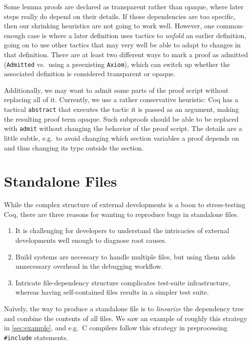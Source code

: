 \documentclass[a4paper,USenglish,cleveref,autoref,thm-restate]{lipics-v2021}
\begin{document}
Some lemma proofs are declared as transparent rather than opaque, where later steps really do depend on their details.
If those dependencies are too specific, then our shrinking heuristics are not going to work well.
However, one common-enough case is where a later definition uses tactics to \emph{unfold} an earlier definition, going on to use other tactics that may very well be able to adapt to changes in that definition.
There are at least two different ways to mark a proof as admitted (\texttt{Admitted} vs.\ using a preexisting \texttt{Axiom}), which can switch up whether the associated definition is considered transparent or opaque.

Additionally, we may want to admit some parts of the proof script without replacing all of it.
Currently, we use a rather conservative heuristic:
Coq has a tactical \verb|abstract| that executes the tactic it is passed as an argument, making the resulting proof term opaque.
Such subproofs should be able to be replaced with \verb|admit| without changing the behavior of the proof script.
The details are a little subtle, e.g.\ to avoid changing which section variables a proof depends on and thus changing its type outside the section.

\section{Standalone Files}\label{sec:standalone}

While the complex structure of external developments is a boon to stress-testing Coq, there are three reasons for wanting to reproduce bugs in standalone files.
\begin{enumerate}
\item It is challenging for developers to understand the intricacies of external developments well enough to diagnose root causes.
\item  Build systems are necessary to handle multiple files, but using them adds unnecessary overhead in the debugging workflow.
\item Intricate file-dependency structure complicates test-suite infrastructure, whereas having self-contained files results in a simpler test suite.
\end{enumerate}

Na\"ively, the way to produce a standalone file is to \emph{linearize} the dependency tree and combine the contents of all files.
We saw an example of roughly this strategy in \autoref{sec:example}, and e.g.\ C compilers follow this strategy in preprocessing \verb|#include| statements.
\end{document}
